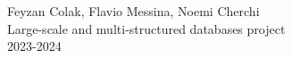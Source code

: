 
\begin{titlepage}
    \centering
    \vspace*{1cm}
    
    \Huge
    
    \vspace{1.5cm}
    
    \vspace{1.5cm}
    
    \Large
    Feyzan Colak, Flavio Messina, Noemi Cherchi  \\
    Large-scale and multi-structured databases project \\
    2023-2024 \\
    
    \vfill
    
\end{titlepage}
